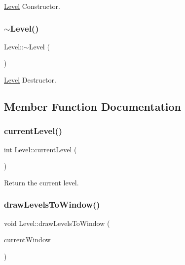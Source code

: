 \hyperlink{class_level}{Level} Constructor. 

\mbox{\label{class_level_a249eac1e8f19ff44134efa5e986feaca}} 
\subsubsection{\texorpdfstring{$\sim$\+Level()}{~Level()}}
{\footnotesize\ttfamily Level\+::$\sim$\+Level (\begin{DoxyParamCaption}{ }\end{DoxyParamCaption})\hspace{0.3cm}{\ttfamily [virtual]}}



\hyperlink{class_level}{Level} Destructor. 



\subsection{Member Function Documentation}
\mbox{\label{class_level_a7ee14ca534888973fab088e511db1341}} 
\subsubsection{\texorpdfstring{current\+Level()}{currentLevel()}}
{\footnotesize\ttfamily int Level\+::current\+Level (\begin{DoxyParamCaption}{ }\end{DoxyParamCaption})}



Return the current level. 

\mbox{\label{class_level_a4cdf43966bbd49ea4f392762c4cd7991}} 
\subsubsection{\texorpdfstring{draw\+Levels\+To\+Window()}{drawLevelsToWindow()}}
{\footnotesize\ttfamily void Level\+::draw\+Levels\+To\+Window (\begin{DoxyParamCaption}\item[{sf\+::\+Render\+Window $\ast$}]{current\+Window }\end{DoxyParamCaption})}



